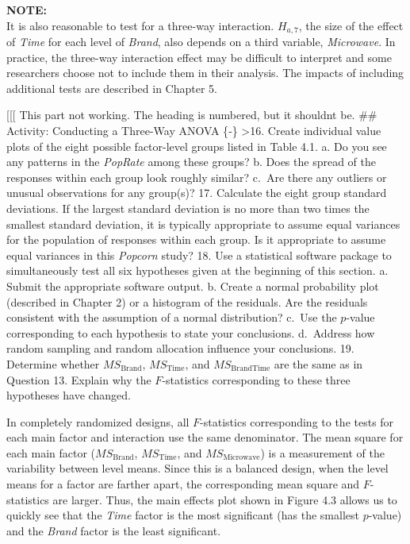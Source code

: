 \documentclass[
]{report}
\begin{document}
\large

\textbf{NOTE:}\\
It is also reasonable to test for a three-way interaction. \(H_{a,7}\), the size of the effect of \emph{Time} for each level of \emph{Brand}, also depends on a third variable, \emph{Microwave}. In practice, the three-way interaction effect may be difficult to interpret and some researchers choose not to include them in their analysis. The impacts of including additional tests are described in Chapter 5.
\normalsize

{[}{[}{[} This part not working. The heading is numbered, but it shouldnt be.
\#\# Activity: Conducting a Three-Way ANOVA \{‑\}
\textgreater16. Create individual value plots of the eight possible factor-level groups listed in Table 4.1.
a. Do you see any patterns in the \emph{PopRate} among these groups?
b. Does the spread of the responses within each group look roughly similar?
c.~Are there any outliers or unusual observations for any group(s)?
17. Calculate the eight group standard deviations. If the largest standard deviation is no more than two times the smallest standard deviation, it is typically appropriate to assume equal variances for the population of responses within each group. Is it appropriate to assume equal variances in this \emph{Popcorn} study?
18. Use a statistical software package to simultaneously test all six hypotheses given at the beginning of this section.
a. Submit the appropriate software output.
b. Create a normal probability plot (described in Chapter 2) or a histogram of the residuals. Are the residuals consistent with the assumption of a normal distribution?
c.~Use the \(p\)-value corresponding to each hypothesis to state your conclusions.
d.~Address how random sampling and random allocation influence your conclusions.
19. Determine whether \(MS_{\text{Brand}}\), \(MS_{\text{Time}}\), and \(MS_{\text{BrandTime}}\) are the same as in Question 13. Explain why the \(F\)-statistics corresponding to these three hypotheses have changed.

In completely randomized designs, all \(F\)-statistics corresponding to the tests for each main factor and interaction use the same denominator. The mean square for each main factor (\(MS_{\text{Brand}}\), \(MS_{\text{Time}}\), and \(MS_{\text{Microwave}}\)) is a measurement of the variability between level means. Since this is a balanced design, when the level means for a factor are farther apart, the corresponding mean square and \(F\)-statistics are larger. Thus, the main effects plot shown in Figure 4.3 allows us to quickly see that the \emph{Time} factor is the most significant (has the smallest \(p\)-value) and the \emph{Brand} factor is the least significant.
\end{document}
